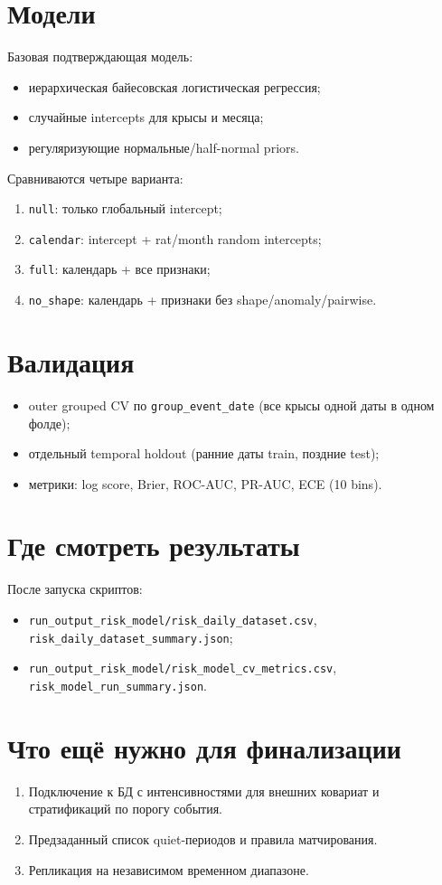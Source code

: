 \documentclass[11pt,a4paper]{article}
\begin{document}
\section{Модели}
Базовая подтверждающая модель:
\begin{itemize}
  \item иерархическая байесовская логистическая регрессия;
  \item случайные intercepts для крысы и месяца;
  \item регуляризующие нормальные/half-normal priors.
\end{itemize}

Сравниваются четыре варианта:
\begin{enumerate}
  \item \texttt{null}: только глобальный intercept;
  \item \texttt{calendar}: intercept + rat/month random intercepts;
  \item \texttt{full}: календарь + все признаки;
  \item \texttt{no\_shape}: календарь + признаки без shape/anomaly/pairwise.
\end{enumerate}

\section{Валидация}
\begin{itemize}
  \item outer grouped CV по \texttt{group\_event\_date} (все крысы одной даты
  в одном фолде);
  \item отдельный temporal holdout (ранние даты train, поздние test);
  \item метрики: log score, Brier, ROC-AUC, PR-AUC, ECE (10 bins).
\end{itemize}

\section{Где смотреть результаты}
После запуска скриптов:
\begin{itemize}
  \item \texttt{run\_output\_risk\_model/risk\_daily\_dataset.csv},
  \texttt{risk\_daily\_dataset\_summary.json};
  \item \texttt{run\_output\_risk\_model/risk\_model\_cv\_metrics.csv},
  \texttt{risk\_model\_run\_summary.json}.
\end{itemize}

\section{Что ещё нужно для финализации}
\begin{enumerate}
  \item Подключение к БД с интенсивностями для внешних ковариат и стратификаций
  по порогу события.
  \item Предзаданный список quiet-периодов и правила матчирования.
  \item Репликация на независимом временном диапазоне.
\end{enumerate}
\end{document}
